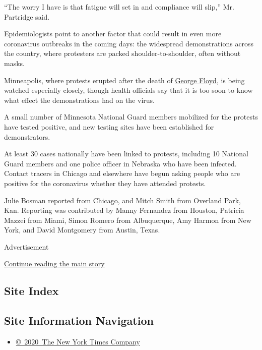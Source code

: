 ``The worry I have is that fatigue will set in and compliance will
slip,'' Mr. Partridge said.

Epidemiologists point to another factor that could result in even more
coronavirus outbreaks in the coming days: the widespread demonstrations
across the country, where protesters are packed shoulder-to-shoulder,
often without masks.

Minneapolis, where protests erupted after the death of
\href{https://www.nytimes.com/article/george-floyd-who-is.html}{George
Floyd}, is being watched especially closely, though health officials say
that it is too soon to know what effect the demonstrations had on the
virus.

A small number of Minnesota National Guard members mobilized for the
protests have tested positive, and new testing sites have been
established for demonstrators.

At least 30 cases nationally have been linked to protests, including 10
National Guard members and one police officer in Nebraska who have been
infected. Contact tracers in Chicago and elsewhere have begun asking
people who are positive for the coronavirus whether they have attended
protests.

Julie Bosman reported from Chicago, and Mitch Smith from Overland Park,
Kan. Reporting was contributed by Manny Fernandez from Houston, Patricia
Mazzei from Miami, Simon Romero from Albuquerque, Amy Harmon from New
York, and David Montgomery from Austin, Texas.

Advertisement

\protect\hyperlink{after-bottom}{Continue reading the main story}

\hypertarget{site-index}{%
\subsection{Site Index}\label{site-index}}

\hypertarget{site-information-navigation}{%
\subsection{Site Information
Navigation}\label{site-information-navigation}}

\begin{itemize}
\tightlist
\item
  \href{https://help.nytimes.com/hc/en-us/articles/115014792127-Copyright-notice}{©~2020~The
  New York Times Company}
\end{itemize}

